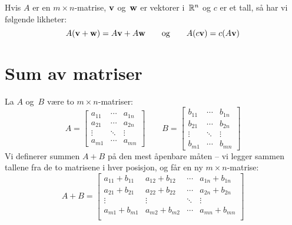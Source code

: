 \begin{thm}
Hvis $A$ er en $m \times n$-matrise, $\mathbf{v}$ og~$\mathbf{w}$ er vektorer
i~$\mathbb{R}^n$ og $c$ er et tall, så har vi følgende likheter:
\[
A (\mathbf{v} + \mathbf{w}) = A \mathbf{v} + A \mathbf{w}
\qquad\text{og}\qquad
A (c \mathbf{v}) = c (A \mathbf{v})
\]
\end{thm}


\section*{Sum av matriser}%

La $A$ og~$B$ være to $m \times n$-matriser:
\[
A =
\begin{bmatrix}
a_{11} & \cdots & a_{1n} \\
a_{21} & \cdots & a_{2n} \\
\vdots & \ddots & \vdots \\
a_{m1} & \cdots & a_{mn}
\end{bmatrix}
\qquad
B =
\begin{bmatrix}
b_{11} & \cdots & b_{1n} \\
b_{21} & \cdots & b_{2n} \\
\vdots & \ddots & \vdots \\
b_{m1} & \cdots & b_{mn}
\end{bmatrix}
\]
Vi definerer summen $A+B$ på den mest åpenbare måten -- vi legger
sammen tallene fra de to matrisene i hver posisjon, og får en ny
$m \times n$-matrise:
\[
A + B =
\begin{bmatrix}
a_{11} + b_{11} & a_{12} + b_{12} & \cdots & a_{1n} + b_{1n} \\
a_{21} + b_{21} & a_{22} + b_{22} & \cdots & a_{2n} + b_{2n} \\
\vdots          & \vdots          & \ddots & \vdots          \\
a_{m1} + b_{m1} & a_{m2} + b_{m2} & \cdots & a_{mn} + b_{mn} \\
\end{bmatrix}
\]

